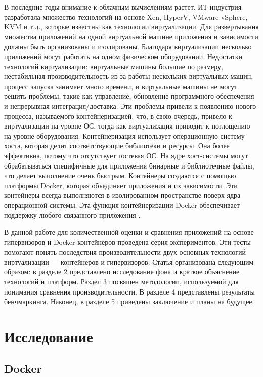 \documentclass{mirea}
\begin{document}
	В последние годы внимание к облачным вычислениям растет. ИТ-индустрия разработала множество технологий на основе Xen, HyperV, VMware vSphere, KVM и т.д., которые известны как технологии виртуализации. Для развертывания множества приложений на одной виртуальной машине приложения и зависимости должны быть организованы и изолированы. Благодаря виртуализации несколько приложений могут работать на одном физическом оборудовании. Недостатки технологий виртуализации: виртуальные машины большие по размеру, нестабильная производительность из-за работы нескольких виртуальных машин, процесс запуска занимает много времени, и виртуальные машины не могут решить проблемы, такие как управление, обновление программного обеспечения и непрерывная интеграция/доставка. Эти проблемы привели к появлению нового процесса, называемого контейнеризацией, что, в свою очередь, привело к виртуализации на уровне ОС, тогда как виртуализация приводит к поглощению на уровне оборудования. Контейнеризация использует операционную систему хоста, которая делит соответствующие библиотеки и ресурсы. Она более эффективна, потому что отсутствует гостевая ОС. На ядре хост-системы могут обрабатываться специфичные для приложения бинарные и библиотечные файлы, что делает выполнение очень быстрым. Контейнеры создаются с помощью платформы Docker, которая объединяет приложения и их зависимости. Эти контейнеры всегда выполняются в изолированном пространстве поверх ядра операционной системы. Эта функция контейнеризации Docker обеспечивает поддержку любого связанного приложения \cite{cit1}.
	
	В данной работе для количественной оценки и сравнения приложений на основе гипервизоров и Docker контейнеров проведена серия экспериментов. Эти тесты помогают понять последствия производительности двух основных технологий виртуализации — контейнеров и гипервизоров. Статья организована следующим образом: в разделе 2 представлено исследование фона и краткое объяснение технологий и платформ. Раздел 3 посвящен методологии, используемой для понимания сравнения производительности. В разделе 4 представлены результаты бенчмаркинга. Наконец, в разделе 5 приведены заключение и планы на будущее.
	
	
	
	\section{Исследование}
	
	\subsection{Docker}
	
\end{document}
